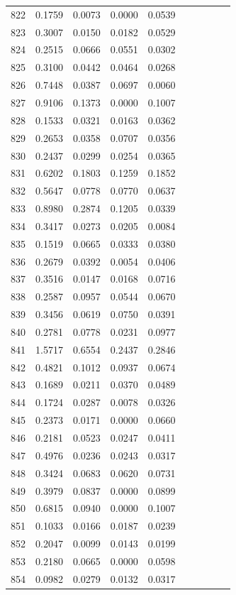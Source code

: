 \begin{table}
\begin{tabular}{cccccccccc}
822& 0.1759& 0.0073& 0.0000& 0.0539\\ 
823& 0.3007& 0.0150& 0.0182& 0.0529\\ 
824& 0.2515& 0.0666& 0.0551& 0.0302\\ 
825& 0.3100& 0.0442& 0.0464& 0.0268\\ 
826& 0.7448& 0.0387& 0.0697& 0.0060\\ 
827& 0.9106& 0.1373& 0.0000& 0.1007\\ 
828& 0.1533& 0.0321& 0.0163& 0.0362\\ 
829& 0.2653& 0.0358& 0.0707& 0.0356\\ 
830& 0.2437& 0.0299& 0.0254& 0.0365\\ 
831& 0.6202& 0.1803& 0.1259& 0.1852\\ 
832& 0.5647& 0.0778& 0.0770& 0.0637\\ 
833& 0.8980& 0.2874& 0.1205& 0.0339\\ 
834& 0.3417& 0.0273& 0.0205& 0.0084\\ 
835& 0.1519& 0.0665& 0.0333& 0.0380\\ 
836& 0.2679& 0.0392& 0.0054& 0.0406\\ 
837& 0.3516& 0.0147& 0.0168& 0.0716\\ 
838& 0.2587& 0.0957& 0.0544& 0.0670\\ 
839& 0.3456& 0.0619& 0.0750& 0.0391\\ 
840& 0.2781& 0.0778& 0.0231& 0.0977\\ 
841& 1.5717& 0.6554& 0.2437& 0.2846\\ 
842& 0.4821& 0.1012& 0.0937& 0.0674\\ 
843& 0.1689& 0.0211& 0.0370& 0.0489\\ 
844& 0.1724& 0.0287& 0.0078& 0.0326\\ 
845& 0.2373& 0.0171& 0.0000& 0.0660\\ 
846& 0.2181& 0.0523& 0.0247& 0.0411\\ 
847& 0.4976& 0.0236& 0.0243& 0.0317\\ 
848& 0.3424& 0.0683& 0.0620& 0.0731\\ 
849& 0.3979& 0.0837& 0.0000& 0.0899\\ 
850& 0.6815& 0.0940& 0.0000& 0.1007\\ 
851& 0.1033& 0.0166& 0.0187& 0.0239\\ 
852& 0.2047& 0.0099& 0.0143& 0.0199\\ 
853& 0.2180& 0.0665& 0.0000& 0.0598\\ 
854& 0.0982& 0.0279& 0.0132& 0.0317\\ 

\end{tabular}
\end{table}
